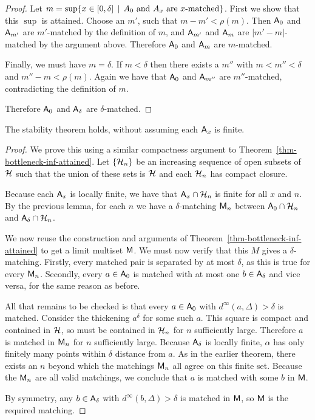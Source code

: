 \begin{proof}
Let $m = \sup \{x\in [0, \delta] \, \mid \, \text{$A_0$ and $A_x$ are $x$-matched}\}$. First we show that this $\sup$ is attained. Choose an $m'$, such that $m - m' < \rho(m)$. Then $\mathsf{A}_0$ and $\mathsf{A}_{m'}$ are $m'$-matched by the definition of $m$, and $\mathsf{A}_{m'}$ and $\mathsf{A}_m$ are $|m'-m|$-matched by the argument above. Therefore $\mathsf{A}_0$ and $\mathsf{A}_m$ are $m$-matched.

Finally, we must have $m = \delta$. If $m < \delta$ then there exists a $m''$ with $m < m'' < \delta$ and $m'' - m < \rho(m)$. Again we have that $\mathsf{A}_0$ and $\mathsf{A}_{m''}$ are $m''$-matched, contradicting the definition of $m$.

Therefore $\mathsf{A}_0$ and $\mathsf{A}_\delta$ are $\delta$-matched.
\end{proof}

\begin{theorem}
The stability theorem holds, without assuming each $\mathsf{A}_x$ is finite.
\end{theorem}
\begin{proof}
We prove this using a similar compactness argument to Theorem~\ref{thm-bottleneck-inf-attained}. Let $\{\mathcal{H}_n\}$ be an increasing sequence of open subsets of $\mathcal{H}$ such that the union of these sets is $\mathcal{H}$ and each $\mathcal{H}_n$ has compact closure.

Because each $\mathsf{A}_x$ is locally finite, we have that $\mathsf{A}_x \cap \mathcal{H}_n$ is finite for all $x$ and $n$. By the previous lemma, for each $n$ we have a $\delta$-matching $\mathsf{M}_n$ between $\mathsf{A}_0 \cap \mathcal{H}_n$ and $\mathsf{A}_\delta \cap \mathcal{H}_n$.

We now reuse the construction and arguments of Theorem~\ref{thm-bottleneck-inf-attained} to get a limit multiset $\mathsf{M}$. We must now verify that this $M$ gives a $\delta$-matching. Firstly, every matched pair is separated by at most $\delta$, as this is true for every $\mathsf{M}_n$. Secondly, every $a \in \mathsf{A}_0$ is matched with at most one $b \in \mathsf{A}_\delta$ and vice versa, for the same reason as before.

All that remains to be checked is that every $a \in \mathsf{A}_0$ with $d^\infty(a, \Delta) > \delta$ is matched. Consider the thickening $a^\delta$ for some such $a$. This square is compact and contained in $\mathcal{H}$, so must be contained in $\mathcal{H}_n$ for $n$ sufficiently large. Therefore $a$ is matched in $\mathsf{M}_n$ for $n$ sufficiently large. Because $\mathsf{A}_\delta$ is locally finite, $\alpha$ has only finitely many points within $\delta$ distance from $a$. As in the earlier theorem, there exists an $n$ beyond which the matchings $\mathsf{M}_n$ all agree on this finite set. Because the $\mathsf{M}_n$ are all valid matchings, we conclude that $a$ is matched with some $b$ in $\mathsf{M}$.

By symmetry, any $b \in \mathsf{A}_\delta$ with $d^\infty(b, \Delta) > \delta$ is matched in $\mathsf{M}$, so $\mathsf{M}$ is the required matching.
\end{proof}
